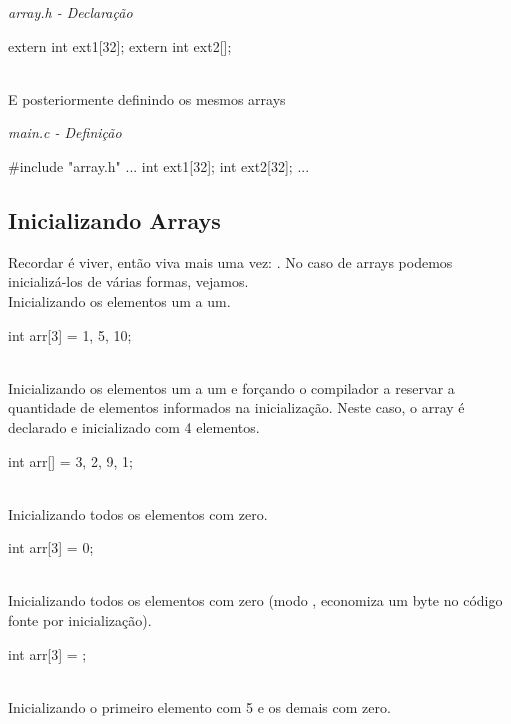 \textit{array.h - Declaração}\\
\begin{ccode}
extern int ext1[32];
extern int ext2[];
\end{ccode}
\\

E posteriormente definindo os mesmos arrays

\textit{main.c - Definição}\\
\begin{ccode}
#include "array.h"
...
int ext1[32];
int ext2[32];
...
\end{ccode}


\subsection{Inicializando Arrays}
Recordar é viver, então viva mais uma vez: . No caso de arrays podemos inicializá-los de várias formas, vejamos.
\\

Inicializando os elementos um a um.

\begin{ccode}
  int arr[3] = {1, 5, 10};
\end{ccode}
\\

Inicializando os elementos um a um e forçando o compilador a reservar a quantidade de elementos informados na inicialização. Neste caso, o array é declarado e inicializado com 4 elementos.

\begin{ccode}
  int arr[] = {3, 2, 9, 1};
\end{ccode}
\\

Inicializando todos os elementos com zero.

\begin{ccode}
  int arr[3] = {0};
\end{ccode}
\\

Inicializando todos os elementos com zero (modo , economiza um byte no código fonte por inicialização).

\begin{ccode}
  int arr[3] = {};
\end{ccode}
\\

Inicializando o primeiro elemento com 5 e os demais com zero.

